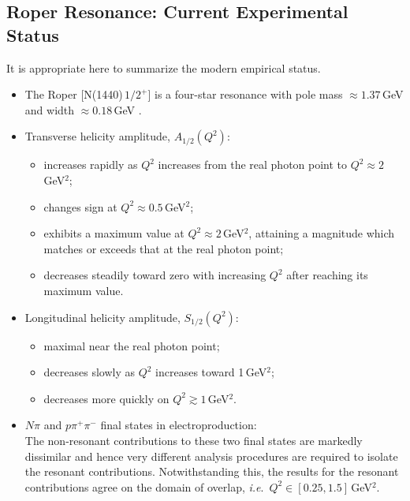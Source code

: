 \subsection{Roper Resonance: Current Experimental Status}
%
It is appropriate here to summarize the modern empirical status.\\[-4ex]
%
\begin{itemize}
\setlength\itemsep{0em}
\item The Roper [N(1440)\,$1/2^+$] is a four-star resonance with pole mass $\approx 1.37\,$GeV and width $\approx 0.18\,$GeV \cite{Olive:2016xmw}.
\item Transverse helicity amplitude, $A_{1/2}(Q^2)$:\\[-1.7em]
\begin{itemize}
\setlength\itemsep{0em}
\item increases rapidly as $Q^2$ increases from the real photon point to $Q^2 \approx 2\,$GeV$^2$;
\item changes sign at $Q^2 \approx 0.5\,$GeV$^2$;
\item exhibits a maximum value at $Q^2 \approx 2\,$GeV$^2$, attaining a magnitude which matches or exceeds that at the real photon point;
\item decreases steadily toward zero with increasing $Q^2$ after reaching its maximum value.
\end{itemize}
\item Longitudinal helicity amplitude, $S_{1/2}(Q^2)$:\\[-1.7em]
\begin{itemize}
\setlength\itemsep{0em}
\item maximal near the real photon point;
\item decreases slowly as $Q^2$ increases toward 1\,GeV$^2$;
\item decreases more quickly on $Q^2 \gtrsim 1\,$GeV$^2$.
\end{itemize}
\item $N \pi$ and $p \pi^+ \pi^-$ final states in electroproduction:\\
%
The non-resonant contributions to these two final states are markedly dissimilar and hence very different analysis procedures are required to isolate the resonant contributions.  Notwithstanding this, the results for the resonant contributions agree on the domain of overlap, \emph{i.e}.\ $Q^2 \in [0.25,1.5]\,$GeV$^2$.

\end{itemize} 